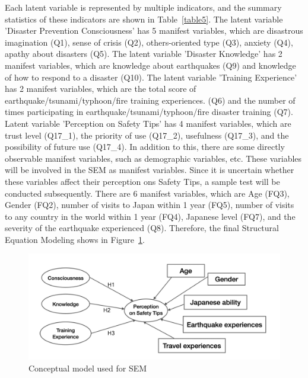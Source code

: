 Each latent variable is represented by multiple indicators, and the summary statistics of these indicators are shown in Table~\ref{table5}. The latent variable 'Disaster Prevention Consciousness' has 5 manifest variables, which are disastrous imagination (Q1), sense of crisis (Q2), others-oriented type (Q3), anxiety (Q4), apathy about disasters (Q5). The latent variable 'Disaster Knowledge' has 2 manifest variables, which are knowledge about earthquakes (Q9) and knowledge of how to respond to a disaster (Q10). The latent variable 'Training Experience' has 2 manifest variables, which are the total score of earthquake/tsunami/typhoon/fire training experiences. (Q6) and the number of times participating in earthquake/tsunami/typhoon/fire disaster training (Q7). Latent variable 'Perception on Safety Tips' has 4 manifest variables, which are trust level (Q17\_1), the priority of use (Q17\_2), usefulness (Q17\_3), and the possibility of future use (Q17\_4). In addition to this, there are some directly observable manifest variables, such as demographic variables, etc. These variables will be involved in the SEM as manifest variables. Since it is uncertain whether these variables affect their perception ons Safety Tips, a sample test will be conducted subsequently. There are 6 manifest variables, which are Age (FQ3), Gender (FQ2), number of visits to Japan within 1 year (FQ5), number of visits to any country in the world within 1 year (FQ4), Japanese level (FQ7), and the severity of the earthquake experienced (Q8). Therefore, the final Structural Equation Modeling shows in Figure~\ref{fig9}.

\begin{figure}[h]
  \includegraphics[width=0.8\linewidth]{Figure/Figure9.png}
  \centering
  \caption{Conceptual model used for SEM }
  \label{fig9}
\end{figure}

